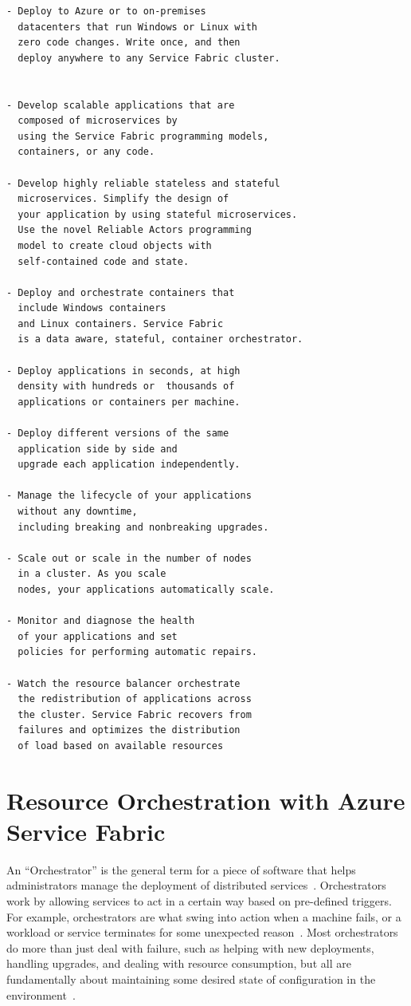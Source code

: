 \begin{verbatim}
- Deploy to Azure or to on-premises 
  datacenters that run Windows or Linux with 
  zero code changes. Write once, and then 
  deploy anywhere to any Service Fabric cluster.
  

- Develop scalable applications that are 
  composed of microservices by
  using the Service Fabric programming models, 
  containers, or any code.

- Develop highly reliable stateless and stateful
  microservices. Simplify the design of 
  your application by using stateful microservices.
  Use the novel Reliable Actors programming
  model to create cloud objects with 
  self-contained code and state.

- Deploy and orchestrate containers that 
  include Windows containers
  and Linux containers. Service Fabric 
  is a data aware, stateful, container orchestrator.

- Deploy applications in seconds, at high 
  density with hundreds or  thousands of 
  applications or containers per machine.

- Deploy different versions of the same 
  application side by side and
  upgrade each application independently.

- Manage the lifecycle of your applications 
  without any downtime,
  including breaking and nonbreaking upgrades.

- Scale out or scale in the number of nodes 
  in a cluster. As you scale
  nodes, your applications automatically scale.

- Monitor and diagnose the health 
  of your applications and set
  policies for performing automatic repairs.

- Watch the resource balancer orchestrate 
  the redistribution of applications across 
  the cluster. Service Fabric recovers from
  failures and optimizes the distribution 
  of load based on available resources

\end{verbatim}


\section{Resource Orchestration with Azure Service Fabric}
An “Orchestrator” is the general term for a piece of software that
helps administrators manage the deployment of distributed
services~\cite{hid-sp18-501-fig2and3}. Orchestrators work by allowing 
services to act in a certain
way based on pre-defined triggers. For example, 
orchestrators are what
swing into action when a machine fails, or a workload or service
terminates for some unexpected reason~\cite{hid-sp18-501-fig2and3}. Most 
orchestrators do more than
just deal with failure, such as helping with new deployments, handling
upgrades, and dealing with resource consumption, but all are
fundamentally about maintaining some desired state of configuration in
the environment~\cite{hid-sp18-501-cluster}.
 

